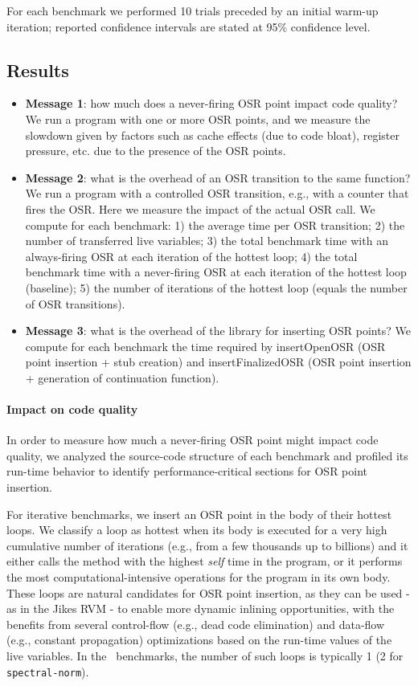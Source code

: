 For each benchmark we performed 10 trials preceded by an initial warm-up iteration; reported confidence intervals are stated at 95\% confidence level.

\subsection{Results}

\begin{itemize}
\item {\bf Message 1}: how much does a never-firing OSR point impact code quality? We run a program with one or more OSR points, and we measure the slowdown given by factors such as cache effects (due to code bloat), register pressure, etc. due to the presence of the OSR points.
\item {\bf Message 2}: what is the overhead of an OSR transition to the same function? We run a program with a controlled OSR transition, e.g., with a counter that fires the OSR. Here we measure the impact of the actual OSR call. We compute for each benchmark: 1) the average time per OSR transition; 2) the number of transferred live variables; 3) the total benchmark time with an always-firing OSR at each iteration of the hottest loop; 4) the total benchmark time with a never-firing OSR at each iteration of the hottest loop (baseline); 5) the number of iterations of the hottest loop (equals the number of OSR transitions).
\item {\bf Message 3}: what is the overhead of the library for inserting OSR points? We compute for each benchmark the time required by insertOpenOSR (OSR point insertion + stub creation) and insertFinalizedOSR (OSR point insertion + generation of continuation function).
\end{itemize}

\paragraph{Impact on code quality}
In order to measure how much a never-firing OSR point might impact code quality, we analyzed the source-code structure of each benchmark and profiled its run-time behavior to identify performance-critical sections for OSR point insertion.

For iterative benchmarks, we insert an OSR point in the body of their hottest loops. We classify a loop as hottest when its body is executed for a very high cumulative number of iterations (e.g., from a few thousands up to billions) and it either calls the method with the highest {\em self} time in the program, or it performs the most computational-intensive operations for the program in its own body. These loops are natural candidates for OSR point insertion, as they can be used - as in the Jikes RVM - to enable more dynamic inlining opportunities, with the benefits from several control-flow (e.g., dead code elimination) and data-flow (e.g., constant propagation) optimizations based on the run-time values of the live variables. In the \shootout\ benchmarks, the number of such loops is typically 1 (2 for {\tt spectral-norm}).

